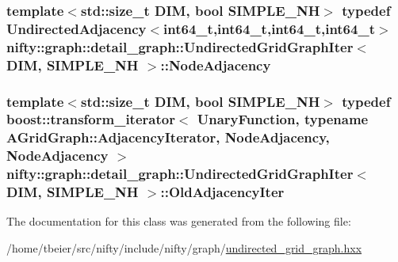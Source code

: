 \subsubsection[{Node\+Adjacency}]{\setlength{\rightskip}{0pt plus 5cm}template$<$std\+::size\+\_\+t D\+I\+M, bool S\+I\+M\+P\+L\+E\+\_\+\+N\+H$>$ typedef Undirected\+Adjacency$<$int64\+\_\+t,int64\+\_\+t,int64\+\_\+t,int64\+\_\+t$>$ {\bf nifty\+::graph\+::detail\+\_\+graph\+::\+Undirected\+Grid\+Graph\+Iter}$<$ D\+I\+M, S\+I\+M\+P\+L\+E\+\_\+\+N\+H $>$\+::{\bf Node\+Adjacency}}\label{classnifty_1_1graph_1_1detail__graph_1_1UndirectedGridGraphIter_ab102d464df39aae71f7482baa37d8966}
\hypertarget{classnifty_1_1graph_1_1detail__graph_1_1UndirectedGridGraphIter_a0b2569d896d215175b54ed1f439ad5a5}{}
\subsubsection[{Old\+Adjacency\+Iter}]{\setlength{\rightskip}{0pt plus 5cm}template$<$std\+::size\+\_\+t D\+I\+M, bool S\+I\+M\+P\+L\+E\+\_\+\+N\+H$>$ typedef boost\+::transform\+\_\+iterator$<$ {\bf Unary\+Function}, typename A\+Grid\+Graph\+::\+Adjacency\+Iterator, {\bf Node\+Adjacency}, {\bf Node\+Adjacency} $>$ {\bf nifty\+::graph\+::detail\+\_\+graph\+::\+Undirected\+Grid\+Graph\+Iter}$<$ D\+I\+M, S\+I\+M\+P\+L\+E\+\_\+\+N\+H $>$\+::{\bf Old\+Adjacency\+Iter}}\label{classnifty_1_1graph_1_1detail__graph_1_1UndirectedGridGraphIter_a0b2569d896d215175b54ed1f439ad5a5}


The documentation for this class was generated from the following file\+:\begin{DoxyCompactItemize}
\item 
/home/tbeier/src/nifty/include/nifty/graph/\hyperlink{graph_2undirected__grid__graph_8hxx}{undirected\+\_\+grid\+\_\+graph.\+hxx}\end{DoxyCompactItemize}
